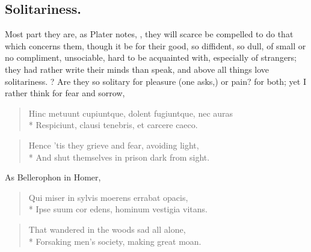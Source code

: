 {\subsection{Solitariness.}
Most part they are, as Plater notes, , \etc{} they will scarce be compelled to do that which
concerns them, though it be for their good, so diffident, so dull, of small or
no compliment, unsociable, hard to be acquainted with, especially of strangers;
they had rather write their minds than speak, and above all things love
solitariness. ? Are they so solitary
for pleasure (one asks,) or pain? for both; yet I rather think for fear and
sorrow, \etc{}

\begin{latin}
\begin{verse}%
Hinc metuunt cupiuntque, dolent fugiuntque, nec auras\\*
Respiciunt, clausi tenebris, et carcere caeco.
\end{verse}%
\end{latin}
\translationrule%
\begin{verse}%
Hence 'tis they grieve and fear, avoiding light,\\*
And shut themselves in prison dark from sight.
\end{verse}%

As Bellerophon in Homer,

\begin{latin}
\begin{verse}%
Qui miser in sylvis moerens errabat opacis,\\*
Ipse suum cor edens, hominum vestigia vitans.
\end{verse}%
\end{latin}
\translationrule%
\begin{verse}%
That wandered in the woods sad all alone,\\*
Forsaking men's society, making great moan.
\end{verse}%

}
